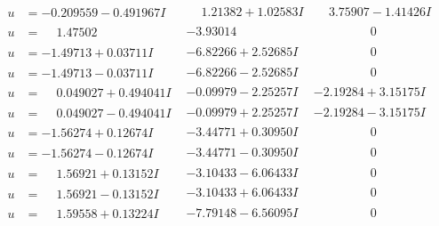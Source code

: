 \documentclass[1p]{elsarticle_modified}
\theoremstyle{definition}
\begin{document}
$$\begin{array}{c|c|c}
\begin{aligned}
u &= -0.209559 - 0.491967 I\end{aligned}
 & \phantom{-}1.21382 + 1.02583 I & \phantom{-}3.75907 - 1.41426 I \\ \hline\begin{aligned}
u &= \phantom{-}1.47502\phantom{ +0.000000I}\end{aligned}
 & -3.93014\phantom{ +0.000000I} & \phantom{-0.000000 } 0 \\ \hline\begin{aligned}
u &= -1.49713 + 0.03711 I\end{aligned}
 & -6.82266 + 2.52685 I & \phantom{-0.000000 } 0 \\ \hline\begin{aligned}
u &= -1.49713 - 0.03711 I\end{aligned}
 & -6.82266 - 2.52685 I & \phantom{-0.000000 } 0 \\ \hline\begin{aligned}
u &= \phantom{-}0.049027 + 0.494041 I\end{aligned}
 & -0.09979 - 2.25257 I & -2.19284 + 3.15175 I \\ \hline\begin{aligned}
u &= \phantom{-}0.049027 - 0.494041 I\end{aligned}
 & -0.09979 + 2.25257 I & -2.19284 - 3.15175 I \\ \hline\begin{aligned}
u &= -1.56274 + 0.12674 I\end{aligned}
 & -3.44771 + 0.30950 I & \phantom{-0.000000 } 0 \\ \hline\begin{aligned}
u &= -1.56274 - 0.12674 I\end{aligned}
 & -3.44771 - 0.30950 I & \phantom{-0.000000 } 0 \\ \hline\begin{aligned}
u &= \phantom{-}1.56921 + 0.13152 I\end{aligned}
 & -3.10433 - 6.06433 I & \phantom{-0.000000 } 0 \\ \hline\begin{aligned}
u &= \phantom{-}1.56921 - 0.13152 I\end{aligned}
 & -3.10433 + 6.06433 I & \phantom{-0.000000 } 0 \\ \hline\begin{aligned}
u &= \phantom{-}1.59558 + 0.13224 I\end{aligned}
 & -7.79148 - 6.56095 I & \phantom{-0.000000 } 0 \\ \hline\begin{aligned}

\end{aligned}
\end{array}$$
\end{document}

